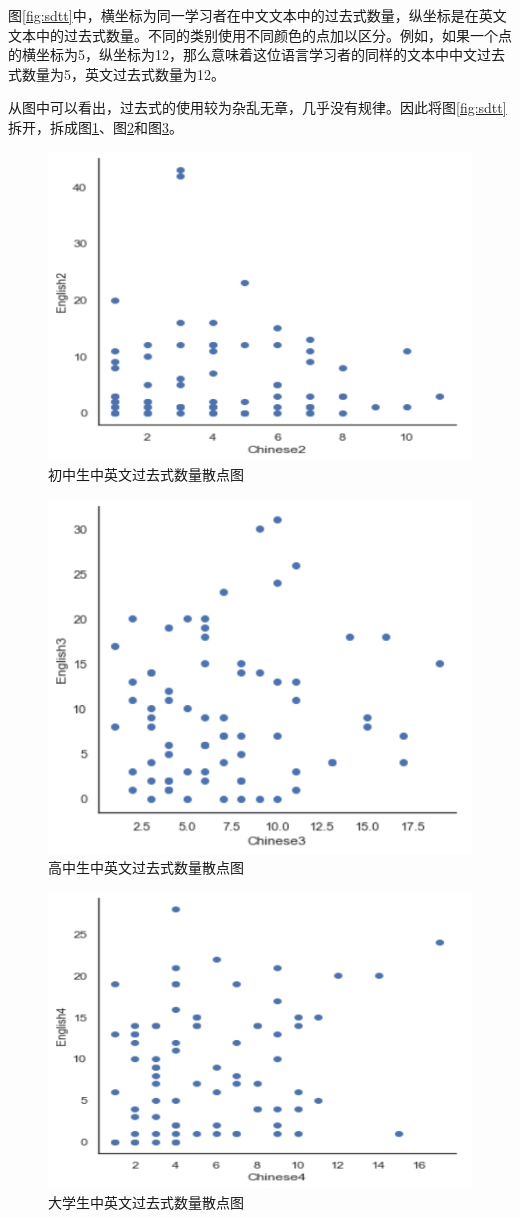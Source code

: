 \documentclass[]{article}
\begin{document}
图\ref{fig:sdtt}中，横坐标为同一学习者在中文文本中的过去式数量，纵坐标是在英文文本中的过去式数量。不同的类别使用不同颜色的点加以区分。例如，如果一个点的横坐标为5，纵坐标为12，那么意味着这位语言学习者的同样的文本中中文过去式数量为5，英文过去式数量为12。

从图中可以看出，过去式的使用较为杂乱无章，几乎没有规律。因此将图\ref{fig:sdtt}拆开，拆成图\ref{fig:sdt2}、图\ref{fig:sdt3}和图\ref{fig:sdt4}。

\begin{figure}
	\centering
	\includegraphics[width=0.7\linewidth]{fig/sdt2}
	\caption{初中生中英文过去式数量散点图}
	\label{fig:sdt2}
\end{figure}

\begin{figure}
	\centering
	\includegraphics[width=0.7\linewidth]{fig/sdt3}
	\caption{高中生中英文过去式数量散点图}
	\label{fig:sdt3}
\end{figure}

\begin{figure}
	\centering
	\includegraphics[width=0.7\linewidth]{fig/sdt4}
	\caption{大学生中英文过去式数量散点图}
	\label{fig:sdt4}
\end{figure}
\end{document}
